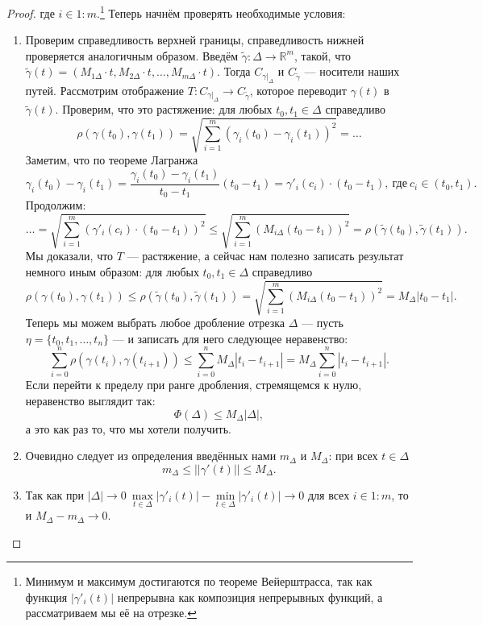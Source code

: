 \begin{proof}
	
	где \(i \in 1 : m\).\footnote{Минимум и максимум достигаются по теореме Вейерштрасса, так как функция \(|\gamma'_i(t)|\) непрерывна как композиция непрерывных функций, а рассматриваем мы её на отрезке.} Теперь начнём проверять необходимые условия:
	\begin{enumerate}
		\item Проверим справедливость верхней границы, справедливость нижней проверяется аналогичным образом. Введём \(\widetilde{\gamma} \colon \Delta \to \mathbb{R}^m\), такой, что \(\widetilde{\gamma}(t) = (M_{1\Delta} \cdot t, M_{2\Delta} \cdot t, \ldots, M_{m\Delta} \cdot t)\). Тогда \(C_{\gamma |_\Delta}\) и \(C_{\widetilde{\gamma}}\) --- носители наших путей. Рассмотрим отображение \(T \colon C_{\gamma |_\Delta} \to C_{\widetilde{\gamma}}\), которое переводит \(\gamma(t)\) в \(\widetilde{\gamma}(t)\). Проверим, что это растяжение: для любых  \(t_0, t_1 \in \Delta\) справедливо \[
			\rho(\gamma(t_0), \gamma(t_1)) =  \sqrt{\sum\limits_{i = 1}^m (\gamma_i (t_0) - \gamma_i (t_1))^2} = \ldots
		\]
		 Заметим, что по теореме Лагранжа \[
			\gamma_i (t_0) - \gamma_i (t_1) = \frac{\gamma_i (t_0) - \gamma_i (t_1)}{t_0 - t_1} (t_0 - t_1) = \gamma'_i(c_i) \cdot (t_0 - t_1), \ \text{где} \ c_i \in (t_0, t_1).
		\]
		Продолжим: \[
			\ldots =  \sqrt{\sum\limits_{i = 1}^m (\gamma'_i(c_i) \cdot (t_0 - t_1))^2} \leqslant \sqrt{\sum\limits_{i = 1}^m (M_{i\Delta} (t_0 - t_1) )^2} = \rho(\widetilde{\gamma}(t_0), \widetilde{\gamma}(t_1)).
		\]
		Мы доказали, что \(T\) --- растяжение, а сейчас нам полезно записать результат немного иным образом: для любых \(t_0, t_1 \in \Delta\) справедливо \[
			\rho(\gamma(t_0), \gamma(t_1)) \leqslant \rho(\widetilde{\gamma}(t_0), \widetilde{\gamma}(t_1)) = \sqrt{\sum\limits_{i = 1}^m (M_{i\Delta} (t_0 - t_1) )^2} = M_\Delta |t_0 - t_1|.
		\]
		Теперь мы можем выбрать любое дробление отрезка \(\Delta\) --- пусть \(\eta = \{t_0, t_1, \ldots, t_n\}\) --- и записать для него следующее неравенство: \[
			\sum_{i = 0}^n \rho(\gamma(t_i), \gamma(t_{i + 1})) \leqslant \sum_{i = 0}^n M_\Delta |t_i - t_{i + 1}| = M_\Delta \sum_{i = 0}^n |t_i - t_{i + 1}|.
		\]
		Если перейти к пределу при ранге дробления, стремящемся к нулю, неравенство выглядит так: \[
			\Phi(\Delta) \leqslant M_\Delta |\Delta|,
		\]
		а это как раз то, что мы хотели получить.
		\item Очевидно следует из определения введённых нами \(m_\Delta\) и \(M_\Delta\): при всех \(t \in \Delta\) \[
			m_\Delta \leqslant ||\gamma'(t)||\leqslant M_\Delta.
		\]
		\item Так как при \(|\Delta| \to 0 \ \max\limits_{t \in \Delta} |\gamma'_i (t)| - \min\limits_{t \in \Delta} |\gamma'_i (t)| \to 0\) для всех \(i \in 1 : m\), то и \(M_\Delta - m_\Delta \to 0\).
	\end{enumerate}
\end{proof}

